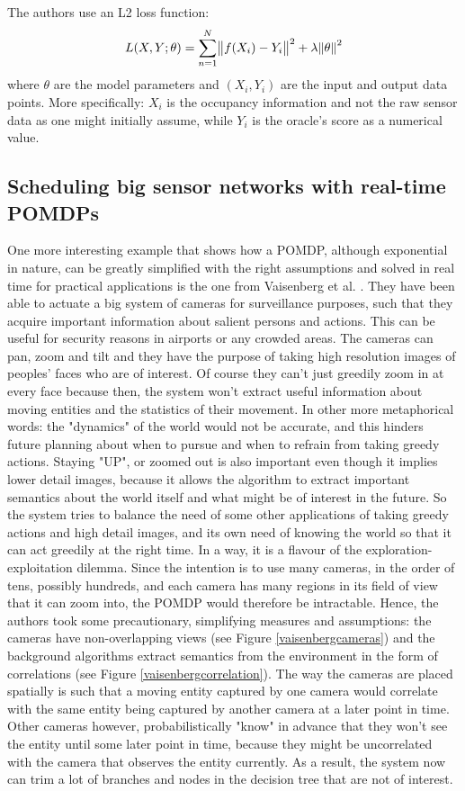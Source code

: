 \documentclass[a4paper,11pt,english]{article}
\begin{document}
The authors use an L2 loss function:
\begin{equation}
L(X,Y;\theta)=\sum_{n=1}^N \norm{f(X_i)-Y_i}^2 + \lambda \norm{\theta}^2
\end{equation}
 where $\theta$ are the model parameters and $(X_i, Y_i)$ are the input and output data points. More specifically: $X_i$  is the occupancy information and not the raw sensor data as one might initially assume, while $Y_i$ is the oracle's score as a numerical value. 


\subsection{Scheduling big sensor networks with real-time POMDPs}

One more interesting example that shows how a POMDP, although exponential in nature, can be greatly simplified with the right assumptions and solved in real time for practical applications is the one from Vaisenberg et al. \cite{vaisenberg2014scheduling}. They have been able to actuate a big system of cameras for surveillance purposes, such that they acquire important information about salient persons and actions. This can be useful for security reasons in airports or any crowded areas. The cameras can pan, zoom and tilt and they have the purpose of taking high resolution images of peoples' faces who are of interest. Of course they can't just greedily zoom in at every face because then, the system won't extract useful information about moving entities and the statistics of their movement. In other more metaphorical words: the "dynamics" of the world would not be accurate, and this hinders future planning about when to pursue and when to refrain from taking greedy actions. Staying "UP", or zoomed out is also important even though it implies lower detail images, because it allows the algorithm to extract important semantics about the world itself and what might be of interest in the future. So the system tries to balance the need of some other applications of taking greedy actions and high detail images, and its own need of knowing the world so that it can act greedily at the right time. In a way, it is a flavour of the exploration-exploitation dilemma. Since the intention is to use many cameras, in the order of tens, possibly hundreds, and each camera has many regions in its field of view that it can zoom into, the POMDP would therefore be intractable. Hence, the authors took some precautionary, simplifying measures and assumptions: the cameras have non-overlapping views (see Figure \ref{vaisenbergcameras}) and the background algorithms extract semantics from the environment in the form of correlations (see Figure \ref{vaisenbergcorrelation}). The way the cameras are placed spatially is such that a moving entity captured by one camera would correlate with the same entity being captured by another camera at a later point in time. Other cameras however, probabilistically "know" in advance that they won't see the entity until some later point in time, because they might be uncorrelated with the camera that observes the entity currently. As a result, the system now can trim a lot of branches and nodes in the decision tree that are not of interest.
\end{document}
